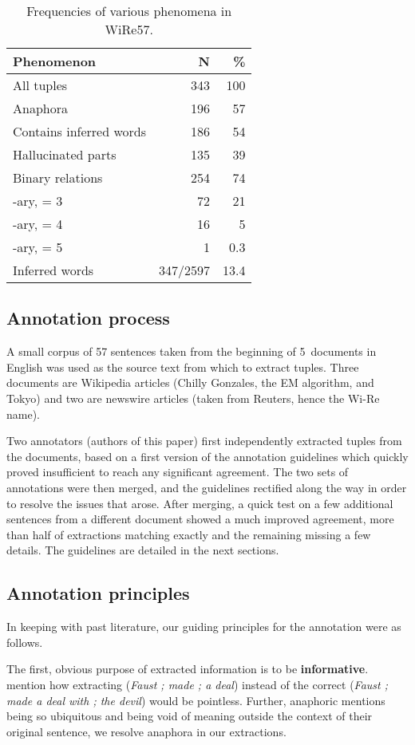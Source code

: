 \pdfoutput=1 \documentclass[11pt, a4paper]{article}
\begin{document}
\begin{table}[htb]
\centering
\begin{tabular}{lrr}
Phenomenon & N & \%\\
\hline
All tuples & 343 & 100\\
Anaphora & 196 & 57\\
Contains inferred words & 186 & 54\\
Hallucinated parts & 135 & 39\\
Binary relations & 254 & 74\\
-ary,  = 3 & 72 & 21\\
-ary,  = 4 & 16 & 5\\
-ary,  = 5 & 1 & 0.3\\
\hline
Inferred words & 347/2597 & 13.4\\
\end{tabular}
\caption{\label{tab:org109a930}
Frequencies of various phenomena in WiRe57.}
\end{table}

\subsection{Annotation process}
\label{sec:org85568e7}
A small corpus of 57 sentences taken from the beginning of 5~documents in
English was used as the source text from which to extract tuples. Three
documents are Wikipedia articles (Chilly Gonzales, the EM algorithm, and Tokyo)
and two are newswire articles (taken from Reuters, hence the Wi-Re name).

Two annotators (authors of this paper) first independently extracted tuples
from the documents, based on a first version of the annotation guidelines
which quickly proved insufficient to reach any significant agreement. The
two sets of annotations were then merged, and the guidelines rectified
along the way in order to resolve the issues that arose. After merging, a quick test on a few additional sentences from a different document showed a much improved agreement, more than half of extractions matching exactly and the remaining missing a few details. The guidelines are detailed in the next sections.

\subsection{Annotation principles}
\label{sec:org1c2d80b}
In keeping with past literature, our guiding principles for the annotation
were as follows.

The first, obvious purpose of extracted information is to be
\textbf{informative}. \citet{Fader:2011:IRO:2145432.2145596} mention how
extracting (\emph{Faust ; made ; a deal}) instead of the correct (\emph{Faust ; made
a deal with ; the devil}) would be pointless. Further, anaphoric mentions
being so ubiquitous and being void of meaning outside the context of their
original sentence, we resolve anaphora in our extractions.
\end{document}
